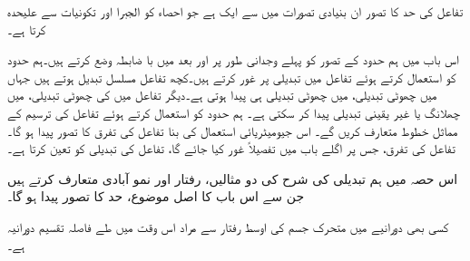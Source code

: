 تفاعل کی حد کا تصور ان بنیادی تصورات میں سے ایک ہے جو احصاء کو الجبرا اور تکونیات سے علیحدہ کرتا ہے۔

اس باب میں ہم حدود کے تصور کو پہلے وجدانی طور پر اور بعد میں با ضابطہ وضع کرتے ہیں۔ہم حدود کو استعمال کرتے ہوئے تفاعل  میں تبدیلی پر غور کرتے ہیں۔کچھ تفاعل مسلسل تبدیل ہوتے ہیں جہاں  میں چھوٹی تبدیلی،  میں چھوٹی تبدیلی ہی پیدا ہوتی ہے۔دیگر تفاعل میں  کی چھوٹی تبدیلی،  میں چھلانگ یا غیر یقینی تبدیلی  پیدا کر سکتی ہے۔ ہم حدود کو استعمال کرتے ہوئے تفاعل کی ترسیم کے مماثل خطوط متعارف کریں گے۔ اس جیومیٹریائی استعمال کی بنا تفاعل کی تفرق کا تصور پیدا ہو گا۔تفاعل کی تفرق، جس پر اگلے باب میں تفصیلاً غور کیا جائے گا، تفاعل کی تبدیلی کو تعین کرتا ہے۔

اس حصہ میں ہم تبدیلی کی شرح کی دو مثالیں، رفتار اور نمو آبادی متعارف کرتے ہیں جن سے اس باب کا اصل موضوع، حد کا تصور پیدا ہو گا۔

کسی بھی دورانیے میں متحرک جسم کی اوسط رفتار سے مراد اس وقت میں طے فاصلہ تقسیم دورانیہ ہے۔

